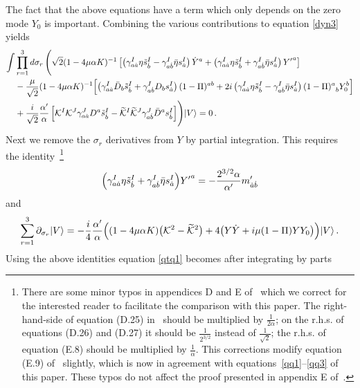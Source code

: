\documentclass[12pt]{article}
\def\a{\alpha}
\def\g{\gamma}
\def\m{\mu}
\def\s{\sigma}
\def\mc{\mathcal}
\def\p{\partial}
\def\ra{\rangle}
\def\wt{\widetilde}
\numberwithin{equation}{section} \setlength{\textwidth}{17cm}
\begin{document}
The fact that the above equations have a term which only depends
on the zero mode $Y_0$ is important. Combining the various
contributions to equation \eqref{dyn3} yields
\begin{align}
\int & \prod_{r=1}^3d\s_r\,\Biggl( \sqrt{2}(1-4\m\a K)^{-1}\left[
\left(\g^I_{a\dot{a}}\eta\tilde{s}^I_{\dot{b}}-\g^{I}_{a\dot{b}}\bar{\eta}s^I_{\dot{a}}\right)\dot{Y}^a
+\left(\g^I_{a\dot{a}}\eta\tilde{s}^I_{\dot{b}}+\g^{I}_{a\dot{b}}\bar{\eta}s^I_{\dot{a}}\right){Y'}^a\right]
\nonumber\\
&-\frac{\m}{\sqrt{2}}(1-4\m\a K)^{-1}\Bigl[
\left(\g^I_{a\dot{a}}\bar{D}_b\tilde{s}^I_{\dot{b}}+\g^I_{a\dot{b}}D_bs^I_{\dot{a}}\right)(1-\Pi)^{ab}
+2i\left(\g^I_{a\dot{a}}\eta\tilde{s}^I_{\dot{b}}-\g^I_{a\dot{b}}\bar{\eta}s^I_{\dot{a}}\right){(1-\Pi)^a}_bY_0^b
\Bigr]\nonumber\\
&\label{qtq1}+\frac{i}{\sqrt{2}}\frac{\a'}{\a}\left[ {\mc K}^I{\mc
K}^J\g^J_{a\dot{a}}D^a\tilde{s}^I_{\dot{b}}-\wt{\mc K}^I\wt{\mc
K}^J\g^J_{a\dot{b}}\bar{D}^as^I_{\dot{b}}
\right]\Biggr)|V\ra=0\,.
\end{align}
Next we remove the $\s_r$ derivatives from $Y$ by partial
integration. This requires the identity~\cite{gsb}\footnote{There are some minor typos in appendices 
D and E of~\cite{gsb} which we correct for the interested reader to facilitate the comparison with this paper. 
The right-hand-side of equation (D.25) in~\cite{gsb} should be multiplied by $\frac{1}{2\a}$; on the 
r.h.s. of equations (D.26) and (D.27) it should be $\frac{1}{2^{3/2}}$ instead of $\frac{1}{\sqrt{2}}$; the 
r.h.s. of equation (E.8) should be multiplied by $\frac{1}{\a}$. This corrections modify equation (E.9) of~\cite{gsb}
slightly, which is now in agreement with equations~\eqref{qq1}--\eqref{qq3} of this paper. 
These typos do not affect the proof presented in appendix E of~\cite{gsb}. }
\begin{equation}
\Bigl(\g^I_{a\dot{a}}\eta\tilde{s}^I_{\dot{b}}+\g^I_{a\dot{b}}\bar{\eta}s^I_{\dot{a}}\Bigr){Y'}^a
=-\frac{2^{3/2}\a}{\a'}m'_{\dot{a}\dot{b}}
\end{equation}
and
\begin{equation}
\sum_{r=1}^3\p_{\s_r}|V\ra=-\frac{i}{4}\frac{\a'}{\a}\Bigl(
(1-4\m\a K)\bigl({\mc K}^2-\wt{\mc
K}^2\bigr)+4\bigl(Y\dot{Y}+i\m(1-\Pi)YY_0\bigr)\Bigr)|V\ra\,.
\end{equation}
Using the above identities equation \eqref{qtq1} becomes after
integrating by parts
\end{document}
